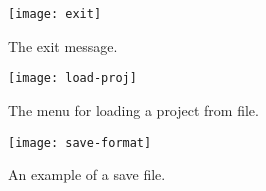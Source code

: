 \begin{figure}
  \begin{center}
    \texttt{[image: exit]}
  \end{center}
  \caption{The exit message.}
  \label{fig:exit}
\end{figure}
\begin{figure}
  \begin{center}
    \texttt{[image: load-proj]}
  \end{center}
  \caption{The menu for loading a project from file.}
  \label{fig:load}
\end{figure}
\begin{figure}
  \begin{center}
    \texttt{[image: save-format]}
  \end{center}
  \caption{An example of a save file.}
  \label{fig:file}
\end{figure}
\clearpage
